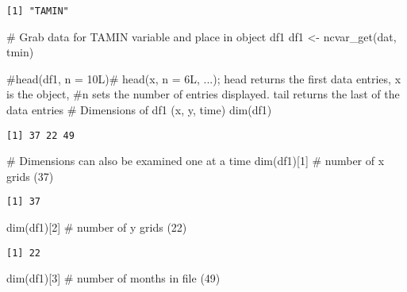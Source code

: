\documentclass[
  letterpaper,
]{book}
\newenvironment{Shaded}{\begin{snugshade}}{\end{snugshade}}
\newcommand{\CommentTok}[1]{\textcolor[rgb]{0.37,0.37,0.37}{#1}}
\newcommand{\DecValTok}[1]{\textcolor[rgb]{0.68,0.00,0.00}{#1}}
\newcommand{\FunctionTok}[1]{\textcolor[rgb]{0.28,0.35,0.67}{#1}}
\newcommand{\NormalTok}[1]{\textcolor[rgb]{0.00,0.23,0.31}{#1}}
\newcommand{\OtherTok}[1]{\textcolor[rgb]{0.00,0.23,0.31}{#1}}
\begin{document}
\begin{verbatim}
[1] "TAMIN"
\end{verbatim}

\begin{Shaded}
\begin{Highlighting}[]
\CommentTok{\# Grab data for TAMIN variable and place in object df1}
\NormalTok{df1 }\OtherTok{\textless{}{-}} \FunctionTok{ncvar\_get}\NormalTok{(dat, tmin)}

\CommentTok{\#head(df1, n = 10L)\# head(x, n = 6L, ...); head returns the first data  entries, x is the object, }
\CommentTok{\#n sets the number of entries displayed. tail returns  the last of the data entries         }
\CommentTok{\# Dimensions of df1 (x, y, time)}
\FunctionTok{dim}\NormalTok{(df1)}
\end{Highlighting}
\end{Shaded}

\begin{verbatim}
[1] 37 22 49
\end{verbatim}

\begin{Shaded}
\begin{Highlighting}[]
\CommentTok{\# Dimensions can also be examined one at a time}
\FunctionTok{dim}\NormalTok{(df1)[}\DecValTok{1}\NormalTok{]     }\CommentTok{\# number of x grids (37)}
\end{Highlighting}
\end{Shaded}

\begin{verbatim}
[1] 37
\end{verbatim}

\begin{Shaded}
\begin{Highlighting}[]
\FunctionTok{dim}\NormalTok{(df1)[}\DecValTok{2}\NormalTok{]     }\CommentTok{\# number of y grids (22)}
\end{Highlighting}
\end{Shaded}

\begin{verbatim}
[1] 22
\end{verbatim}

\begin{Shaded}
\begin{Highlighting}[]
\FunctionTok{dim}\NormalTok{(df1)[}\DecValTok{3}\NormalTok{]     }\CommentTok{\# number of months in file (49)}
\end{Highlighting}
\end{Shaded}
\end{document}
